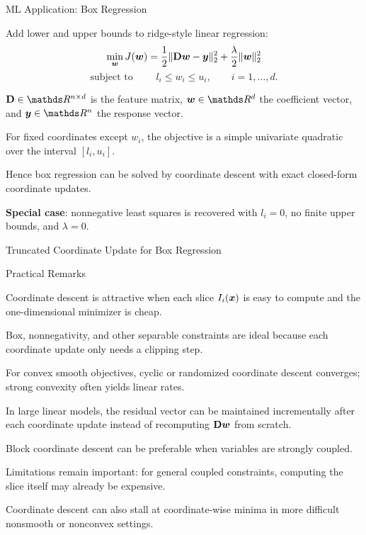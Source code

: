 \documentclass[11pt,compress,t,notes=noshow, xcolor=table]{beamer}
\begin{document}
\begin{framei}[fs=small]{ML Application: Box Regression}
\item Add lower and upper bounds to ridge-style linear regression:
$$
\min_{\bm{w}} J(\bm{w}) = \frac{1}{2}\|\mathbf{D}\bm{w} - \bm{y}\|_2^2 + \frac{\lambda}{2}\|\bm{w}\|_2^2
$$
$$
\text{subject to } \qquad l_i \le w_i \le u_i, \qquad i=1,\dots,d.
$$
\item $\mathbf{D} \in \R^{n \times d}$ is the feature matrix, $\wv \in \R^d$ the coefficient vector, and $\yv \in \R^n$ the response vector.
\item For fixed coordinates except $w_i$, the objective is a simple univariate quadratic over the interval $[l_i,u_i]$.
\item Hence box regression can be solved by coordinate descent with exact closed-form coordinate updates.
\item \textbf{Special case}: nonnegative least squares is recovered with $l_i = 0$, no finite upper bounds, and $\lambda = 0$.
\end{framei}


\begin{framev}[fs=small]{Truncated Coordinate Update for Box Regression}
\end{framev}


\begin{framei}[fs=small]{Practical Remarks}
\item Coordinate descent is attractive when each slice $I_i(\bm{x})$ is easy to compute and the one-dimensional minimizer is cheap.
\item Box, nonnegativity, and other separable constraints are ideal because each coordinate update only needs a clipping step.
\item For convex smooth objectives, cyclic or randomized coordinate descent converges; strong convexity often yields linear rates.
\item In large linear models, the residual vector can be maintained incrementally after each coordinate update instead of recomputing $\mathbf{D}\bm{w}$ from scratch.
\item Block coordinate descent can be preferable when variables are strongly coupled.
\item Limitations remain important: for general coupled constraints, computing the slice itself may already be expensive.
\item Coordinate descent can also stall at coordinate-wise minima in more difficult nonsmooth or nonconvex settings.
\end{framei}
\end{document}
